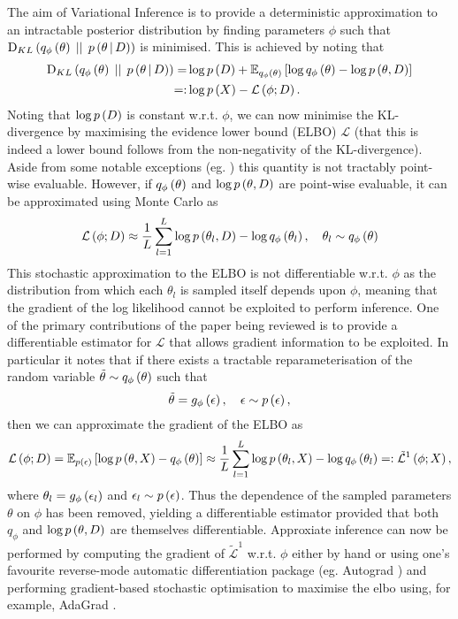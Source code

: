 \documentclass[../report.tex]{subfiles}
\begin{document}
The aim of Variational Inference is to provide a deterministic approximation to an intractable posterior distribution by finding parameters $\phi$ such that $\textrm{D}_{KL} \left( q_\phi \left( \theta\right) \, \mid \mid \, p \left(\theta \, \middle\vert \, D \right)\right)$ is minimised. This is achieved by noting that
\begin{align}
  \textrm{D}_{KL} \left( q_\phi \left( \theta\right) \, \mid \mid \, p \left(\theta \, \middle\vert \, D \right)\right) =& \log p \left( D\right) + \mathbb{E}_{q_\phi \left( \theta\right)} \left[ \log q_\phi \left( \theta\right)  - \log p \left( \theta ,D\right) \right] \nonumber \\
  =:& \log p \left( X\right) - \mathcal{L} \left( \phi; D\right).
\end{align}
Noting that $\log p \left( D\right)$ is constant w.r.t. $\phi$, we can now minimise the KL-divergence by maximising the evidence lower bound (ELBO) $\mathcal{L}$ (that this is indeed a lower bound follows from the non-negativity of the KL-divergence). Aside from some notable exceptions (eg. \cite{titsias2009variational}) this quantity is not tractably point-wise evaluable. However, if $q_\phi \left( \theta\right)$ and $\log p \left( \theta, D\right)$ are point-wise evaluable, it can be approximated using Monte Carlo as
\begin{equation}
  \mathcal{L} \left( \phi; D\right) \approx \frac{1}{L} \sum_{l=1}^{L} \log p \left( \theta_l ,D\right) - \log q_\phi \left( \theta_l\right), \quad \theta_l \sim q_\phi \left( \theta\right)
\end{equation}
This stochastic approximation to the ELBO is not differentiable w.r.t. $\phi$ as the distribution from which each $\theta_l$ is sampled itself depends upon $\phi$, meaning that the gradient of the log likelihood cannot be exploited to perform inference. One of the primary contributions of the paper being reviewed is to provide a differentiable estimator for $\mathcal{L}$ that allows gradient information to be exploited. In particular it notes that if there exists a tractable reparameterisation of the random variable $\tilde{\theta} \sim q_\phi \left( \theta\right)$ such that
\begin{equation}
  \tilde{\theta} = g_\phi \left( \epsilon\right), \quad \epsilon \sim p \left( \epsilon\right),
\end{equation}
then we can approximate the gradient of the ELBO as
\begin{equation}
  \mathcal{L} \left( \phi; D\right) = \mathbb{E}_{p \left( \epsilon\right)} \left[ \log p \left( \theta ,X\right) - q_\phi \left( \theta\right) \right] \approx \frac{1}{L} \sum_{l=1}^{L} \log p \left( \theta_l ,X\right) - \log q_\phi \left( \theta_l\right) =: \tilde{\mathcal{L}}^1 \left( \phi; X\right),
\end{equation}
where $\theta_l = g_\phi \left( \epsilon_l\right)$ and $\epsilon_l \sim p \left( \epsilon\right)$. Thus the dependence of the sampled parameters $\theta$ on $\phi$ has been removed, yielding a differentiable estimator provided that both $q_\phi$ and $\log p \left( \theta ,D\right)$ are themselves differentiable. Approxiate inference can now be performed by computing the gradient of $\tilde{\mathcal{L}}^1$ w.r.t. $\phi$ either by hand or using one's favourite reverse-mode automatic differentiation package (eg. Autograd \cite{maclaurinautograd}) and performing gradient-based stochastic optimisation to maximise the elbo using, for example, AdaGrad \cite{duchi2011adaptive}.
\end{document}
